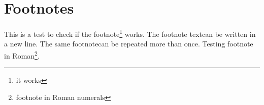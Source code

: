 \documentclass[12pt]{article}
\begin{document}
\section{Footnotes}

This is a test to check if the footnote\footnote[10]{it works} works. The footnote text\footnotemark can be written in a new line.
The same footnote\footnotemark can be repeated more than once\footnotemark[\value{footnote}].
\renewcommand{\thefootnote}{\roman{footnote}}
Testing footnote in Roman\footnote{footnote in Roman numerals}.
\end{document}
